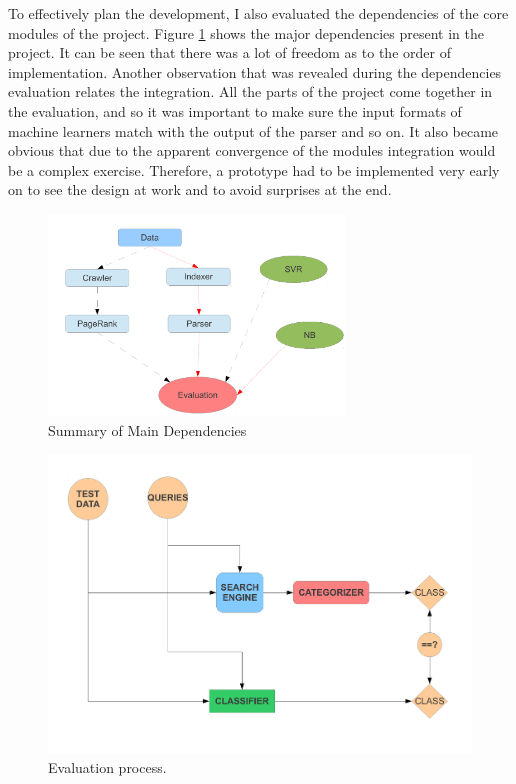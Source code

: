 \documentclass[12pt,notitlepage,twoside]{scrreprt}
\begin{document}
To effectively plan the development, I also evaluated the dependencies of the core modules
of the project. Figure \ref{dep} shows the major dependencies present in the project. It
can be seen that there was a lot of freedom as to the order of implementation. Another
observation that was revealed during the dependencies evaluation relates the integration.
All the parts of the project come together in the evaluation, and so it was important to
make sure the input formats of machine learners match with the output of the parser and so
on. It also became obvious that due to the apparent convergence of the modules integration
would be a complex exercise. Therefore, a prototype had to be implemented very early on to
see the design at work and to avoid surprises at the end.
\begin{figure}[h!]
	\centering
	\includegraphics[width=0.7\textwidth]{figs/dep.pdf}
	\caption{Summary of Main Dependencies\label{dep}}
\end{figure}

\begin{figure}[h]
\centering
\includegraphics[scale=0.5]{figs/eval.pdf}
\caption{Evaluation process. }
\label{eval}
\end{figure}
\end{document}

